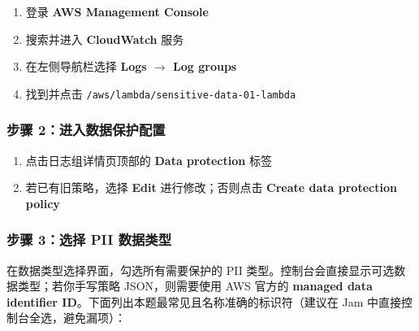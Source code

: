 \documentclass[12pt, a4paper]{article}
\begin{document}
\begin{enumerate}[leftmargin=2em]
  \item 登录 \textbf{AWS Management Console}
  \item 搜索并进入 \textbf{CloudWatch} 服务
  \item 在左侧导航栏选择 \textbf{Logs $\rightarrow$ Log groups}
  \item 找到并点击 \texttt{/aws/lambda/sensitive-data-01-lambda}
\end{enumerate}

\subsubsection{步骤 2：进入数据保护配置}

\begin{enumerate}[leftmargin=2em]
  \item 点击日志组详情页顶部的 \textbf{Data protection} 标签
  \item 若已有旧策略，选择 \textbf{Edit} 进行修改；否则点击 \textbf{Create data protection policy}
\end{enumerate}

\subsubsection{步骤 3：选择 PII 数据类型}

在数据类型选择界面，勾选所有需要保护的 PII 类型。控制台会直接显示可选数据类型；若你手写策略 JSON，则需要使用 AWS 官方的 \textbf{managed data identifier ID}。下面列出本题最常见且名称准确的标识符（建议在 Jam 中直接控制台全选，避免漏项）：
\end{document}

